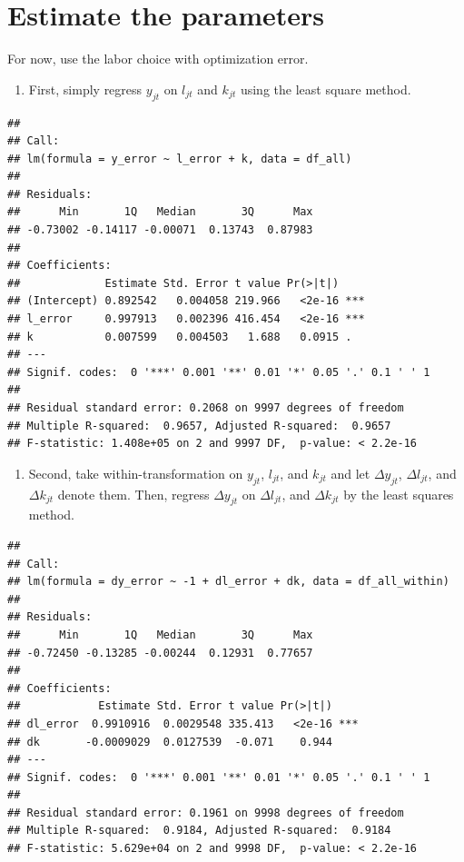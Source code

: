 \documentclass[
]{book}
\providecommand{\tightlist}{%
  \setlength{\itemsep}{0pt}\setlength{\parskip}{0pt}}
\begin{document}
\hypertarget{estimate-the-parameters}{%
\section{Estimate the parameters}\label{estimate-the-parameters}}

For now, use the labor choice with optimization error.

\begin{enumerate}
\def\labelenumi{\arabic{enumi}.}
\tightlist
\item
  First, simply regress \(y_{jt}\) on \(l_{jt}\) and \(k_{jt}\) using the least square method.
\end{enumerate}

\begin{verbatim}
## 
## Call:
## lm(formula = y_error ~ l_error + k, data = df_all)
## 
## Residuals:
##      Min       1Q   Median       3Q      Max 
## -0.73002 -0.14117 -0.00071  0.13743  0.87983 
## 
## Coefficients:
##             Estimate Std. Error t value Pr(>|t|)    
## (Intercept) 0.892542   0.004058 219.966   <2e-16 ***
## l_error     0.997913   0.002396 416.454   <2e-16 ***
## k           0.007599   0.004503   1.688   0.0915 .  
## ---
## Signif. codes:  0 '***' 0.001 '**' 0.01 '*' 0.05 '.' 0.1 ' ' 1
## 
## Residual standard error: 0.2068 on 9997 degrees of freedom
## Multiple R-squared:  0.9657, Adjusted R-squared:  0.9657 
## F-statistic: 1.408e+05 on 2 and 9997 DF,  p-value: < 2.2e-16
\end{verbatim}

\begin{enumerate}
\def\labelenumi{\arabic{enumi}.}
\setcounter{enumi}{1}
\tightlist
\item
  Second, take within-transformation on \(y_{jt}\), \(l_{jt}\), and \(k_{jt}\) and let \(\Delta y_{jt}\), \(\Delta l_{jt}\), and \(\Delta k_{jt}\) denote them. Then, regress \(\Delta y_{jt}\) on \(\Delta l_{jt}\), and \(\Delta k_{jt}\) by the least squares method.
\end{enumerate}

\begin{verbatim}
## 
## Call:
## lm(formula = dy_error ~ -1 + dl_error + dk, data = df_all_within)
## 
## Residuals:
##      Min       1Q   Median       3Q      Max 
## -0.72450 -0.13285 -0.00244  0.12931  0.77657 
## 
## Coefficients:
##            Estimate Std. Error t value Pr(>|t|)    
## dl_error  0.9910916  0.0029548 335.413   <2e-16 ***
## dk       -0.0009029  0.0127539  -0.071    0.944    
## ---
## Signif. codes:  0 '***' 0.001 '**' 0.01 '*' 0.05 '.' 0.1 ' ' 1
## 
## Residual standard error: 0.1961 on 9998 degrees of freedom
## Multiple R-squared:  0.9184, Adjusted R-squared:  0.9184 
## F-statistic: 5.629e+04 on 2 and 9998 DF,  p-value: < 2.2e-16
\end{verbatim}
\end{document}
